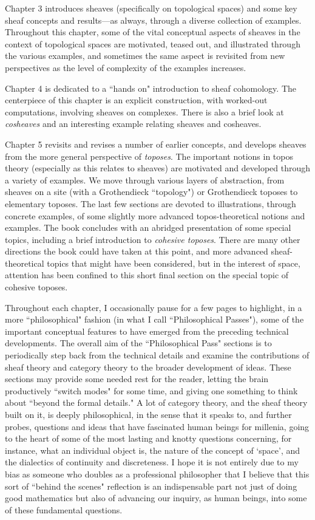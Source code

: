 \documentclass[11pt]{book}
\theoremstyle{definition}
\theoremstyle{definition}
\theoremstyle{definition}
\theoremstyle{theorem}
\theoremstyle{definition}
\begin{document}
	Chapter 3 introduces sheaves (specifically on topological spaces) and some key sheaf concepts and results---as always, through a diverse collection of examples. Throughout this chapter, some of the vital conceptual aspects of sheaves in the context of topological spaces are motivated, teased out, and illustrated through the various examples, and sometimes the same aspect is revisited from new perspectives as the level of complexity of the examples increases. \par 
	Chapter 4 is dedicated to a ``hands on" introduction to sheaf cohomology. The centerpiece of this chapter is an explicit construction, with worked-out computations, involving sheaves on complexes. There is also a brief look at \textit{cosheaves} and an interesting example relating sheaves and cosheaves. \par 
	Chapter 5 revisits and revises a number of earlier concepts, and develops sheaves from the more general perspective of \textit{toposes}. The important notions in topos theory (especially as this relates to sheaves) are motivated and developed through a variety of examples. We move through various layers of abstraction, from sheaves on a site (with a Grothendieck ``topology") or Grothendieck toposes to elementary toposes. The last few sections are devoted to illustrations, through concrete examples, of some slightly more advanced topos-theoretical notions and examples. The book concludes with an abridged presentation of some special topics, including a brief introduction to \textit{cohesive toposes}. There are many other directions the book could have taken at this point, and more advanced sheaf-theoretical topics that might have been considered, but in the interest of space, attention has been confined to this short final section on the special topic of cohesive toposes. \par 
	Throughout each chapter, I occasionally pause for a few pages to highlight, in a more ``philosophical" fashion (in what I call ``Philosophical Passes"), some of the important conceptual features to have emerged from the preceding technical developments. The overall aim of the ``Philosophical Pass" sections is to periodically step back from the technical details and examine the contributions of sheaf theory and category theory to the broader development of ideas. These sections may provide some needed rest for the reader, letting the brain productively ``switch modes" for some time, and giving one something to think about ``beyond the formal details." A lot of category theory, and the sheaf theory built on it, is deeply philosophical, in the sense that it speaks to, and further probes, questions and ideas that have fascinated human beings for millenia, going to the heart of some of the most lasting and knotty questions concerning, for instance, what an individual object is, the nature of the concept of `space', and the dialectics of continuity and discreteness. I hope it is not entirely due to my bias as someone who doubles as a professional philosopher that I believe that this sort of ``behind the scenes" reflection is an indispensable part not just of doing good mathematics but also of advancing our inquiry, as human beings, into some of these fundamental questions. 
\end{document}
